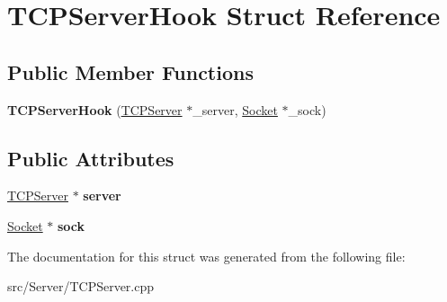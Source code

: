 \hypertarget{struct_t_c_p_server_hook}{\section{T\-C\-P\-Server\-Hook Struct Reference}
\label{struct_t_c_p_server_hook}
}
\subsection*{Public Member Functions}
\begin{DoxyCompactItemize}
\item 
\hypertarget{struct_t_c_p_server_hook_a20bf33f010e41733d8967e81faf65d55}{{\bfseries T\-C\-P\-Server\-Hook} (\hyperlink{class_t_c_p_server}{T\-C\-P\-Server} $\ast$\-\_\-server, \hyperlink{class_socket}{Socket} $\ast$\-\_\-sock)}\label{struct_t_c_p_server_hook_a20bf33f010e41733d8967e81faf65d55}

\end{DoxyCompactItemize}
\subsection*{Public Attributes}
\begin{DoxyCompactItemize}
\item 
\hypertarget{struct_t_c_p_server_hook_a172cab2c468d3335864ebd568603de38}{\hyperlink{class_t_c_p_server}{T\-C\-P\-Server} $\ast$ {\bfseries server}}\label{struct_t_c_p_server_hook_a172cab2c468d3335864ebd568603de38}

\item 
\hypertarget{struct_t_c_p_server_hook_aca27338d2b39429303166c0ec8cb9110}{\hyperlink{class_socket}{Socket} $\ast$ {\bfseries sock}}\label{struct_t_c_p_server_hook_aca27338d2b39429303166c0ec8cb9110}

\end{DoxyCompactItemize}


The documentation for this struct was generated from the following file\-:\begin{DoxyCompactItemize}
\item 
src/\-Server/T\-C\-P\-Server.\-cpp\end{DoxyCompactItemize}
